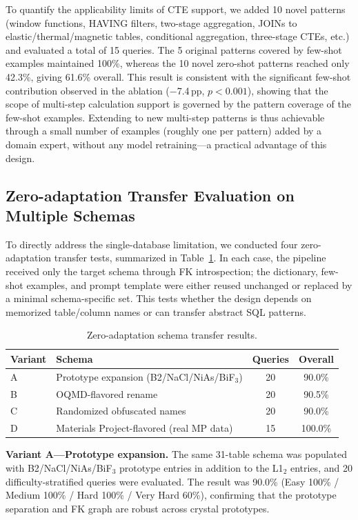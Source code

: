 \documentclass{npj-compt.mater}
\begin{document}
To quantify the applicability limits of CTE support, we added
10 novel patterns (window functions, HAVING filters, two-stage
aggregation, JOINs to elastic/thermal/magnetic tables, conditional
aggregation, three-stage CTEs, etc.) and evaluated a total of
15 queries.
The 5 original patterns covered by few-shot examples maintained
100\%, whereas the 10 novel zero-shot patterns reached only
42.3\%, giving 61.6\% overall.
This result is consistent with the significant few-shot
contribution observed in the ablation ($-$7.4\,pp, $p<0.001$),
showing that the scope of multi-step calculation support is
governed by the pattern coverage of the few-shot examples.
Extending to new multi-step patterns is thus achievable through a
small number of examples (roughly one per pattern) added by a
domain expert, without any model retraining---a practical
advantage of this design.

\subsection{Zero-adaptation Transfer Evaluation on Multiple Schemas}
\label{sec:transfer_eval}

To directly address the single-database limitation, we conducted
four zero-adaptation transfer tests, summarized in
Table~\ref{tab:transfer_eval}. In each case, the pipeline received
only the target schema through FK introspection; the dictionary,
few-shot examples, and prompt template were either reused unchanged
or replaced by a minimal schema-specific set. This tests whether the
design depends on memorized table/column names or can transfer
abstract SQL patterns.

\begin{table}[t]
\centering
\caption{Zero-adaptation schema transfer results.}
\label{tab:transfer_eval}
\begin{tabular}{@{}llcc@{}}
\toprule
Variant & Schema & Queries & Overall \\ \midrule
A & Prototype expansion (B2/NaCl/NiAs/BiF$_3$) & 20 & 90.0\% \\
B & OQMD-flavored rename & 20 & 90.5\% \\
C & Randomized obfuscated names & 20 & 90.0\% \\
D & Materials Project-flavored (real MP data) & 15 & 100.0\% \\
\bottomrule
\end{tabular}
\end{table}

\textbf{Variant A---Prototype expansion.}
The same 31-table schema was populated with B2/NaCl/NiAs/BiF$_3$
prototype entries in addition to the L1$_2$ entries, and 20
difficulty-stratified queries were evaluated. The result was 90.0\%
(Easy 100\% / Medium 100\% / Hard 100\% / Very Hard 60\%),
confirming that the prototype separation and FK graph are robust
across crystal prototypes.
\end{document}

